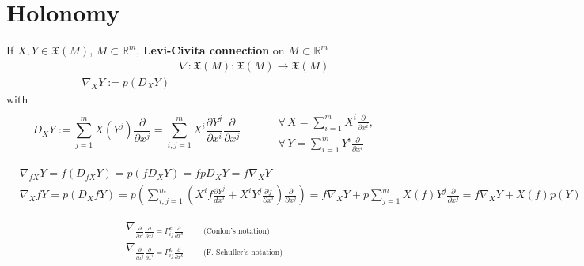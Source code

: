 \part{Holonomy}


\begin{definition}[Conlon, 10.1.2] If $X,Y\in \mathfrak{X}(M)$, $M\subset \mathbb{R}^m$, \textbf{Levi-Civita connection} on $M\subset \mathbb{R}^m$
	\begin{equation}
	\begin{aligned}
	& \nabla : \mathfrak{X}(M) : \mathfrak{X}(M) \to \mathfrak{X}(M) \\
	\nabla_XY := p(D_XY)
	\end{aligned}
	\end{equation}
	with 
	\[
	D_XY := \sum_{j=1}^m X(Y^j) \frac{ \partial }{ \partial x^j} = \sum_{i,j=1}^m X^i \frac{ \partial Y^j}{ \partial x^i} \frac{ \partial }{ \partial x^j} \qquad \,  \begin{aligned} & \quad \\ 
		& \forall \, X=\sum_{i=1}^m X^i \frac{ \partial }{ \partial x^i},  \\
		& \forall \, Y=\sum_{i=1}^m Y^i \frac{\partial }{ \partial x^i } \end{aligned}
	\]
\end{definition}

\[
\begin{aligned}
	& \nabla_{fX}Y = f(D_{fX}Y) = p(fD_XY) = fpD_XY = f\nabla_XY \\ 
	&  \nabla_X fY = p(D_XfY) = p \left( \sum_{i,j=1}^m \left( X^i f\frac{ \partial Y^j}{ dx^i } + X^i Y^j \frac{ \partial f}{ \partial x^i} \right) \frac{ \partial }{ \partial x^j} \right) = f\nabla_X Y + p \sum_{j=1}^m X(f) Y^j \frac{ \partial }{ \partial x^j} = f\nabla_XY + X(f) p(Y)
\end{aligned}
\]


\begin{definition} 
\begin{equation}
\begin{gathered}
	\nabla_{\frac{ \partial }{ \partial x^i} \frac{ \partial }{ \partial x^j} = \Gamma^k_{ij} \frac{ \partial }{ \partial x^k} \qquad \, \text{ (Conlon's notation) }  }   \\
	\nabla_{\frac{ \partial }{ \partial x^j} \frac{ \partial }{ \partial x^i} = \Gamma^k_{ij} \frac{ \partial }{ \partial x^k} \qquad \, \text{ (F. Schuller's notation) }  }
\end{gathered}
\end{equation}
\end{definition}





